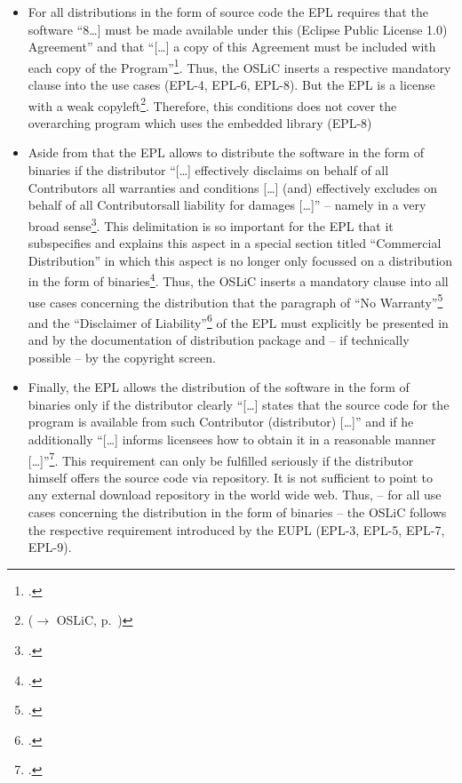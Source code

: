 \begin{itemize}
  \item For all distributions in the form of source code the EPL requires that
  the software \enquote{8\ldots] must be made available under this (Eclipse
  Public License 1.0) Agreement} and that \enquote{[\ldots] a copy of this
  Agreement must be included with each copy of the
  Program}\footcite[cf.][\nopage wp\ §3]{Epl10OsiLicense2005a}. Thus, the OSLiC
  inserts a respective mandatory clause into the use cases (EPL-4, EPL-6,
  EPL-8). But the EPL is a license with a weak copyleft\footnote{($\rightarrow$
  OSLiC, p.\ \pageref{sec:ProtectingPowerOfEpl})}. Therefore, this conditions
  does not cover the overarching program which uses the embedded library (EPL-8)
  
  \item Aside from that the EPL allows to distribute the software in the form of
  binaries if the distributor \enquote{[\ldots] effectively disclaims on behalf
  of all Contributors all warranties and conditions [\ldots] (and) effectively
  excludes on behalf of all Contributorsall liability for damages [\ldots]} --
  namely in a very broad sense\footcite[cf.][\nopage wp\
  §3]{Epl10OsiLicense2005a}. This delimitation is so important for the EPL that
  it subspecifies and explains this aspect in a special section titled
  \enquote{Commercial Distribution} in which this aspect is no longer only
  focussed on a distribution in the form of binaries\footcite[cf.][\nopage wp\
  §4]{Epl10OsiLicense2005a}. Thus, the OSLiC inserts a mandatory clause into all
  use cases concerning the distribution that the paragraph of \enquote{No
  Warranty}\footcite[cf.][\nopage wp\ §5]{Epl10OsiLicense2005a} and the
  \enquote{Disclaimer of Liability}\footcite[cf.][\nopage wp\
  §6]{Epl10OsiLicense2005a} of the EPL must explicitly be presented in and by
  the documentation of distribution package and -- if technically possible -- by
  the copyright screen.
  
  \item Finally, the EPL allows the distribution of the software in the form of
  binaries only if the distributor clearly \enquote{[\ldots] states that the
  source code for the program is available from such Contributor (distributor)
  [\ldots]} and if he additionally \enquote{[\ldots] informs licensees how to
  obtain it in a reasonable manner [\ldots]}\footcite[cf.][\nopage wp\
  §3]{Epl10OsiLicense2005a}. This requirement can only be fulfilled seriously if
  the distributor himself offers the source code via repository. It is not
  sufficient to point to any external download repository in the world wide web.
  Thus, -- for all use cases concerning the distribution in the form of binaries
  -- the OSLiC follows the respective requirement introduced by the EUPL (EPL-3,
  EPL-5, EPL-7, EPL-9). 
  

\end{itemize}
